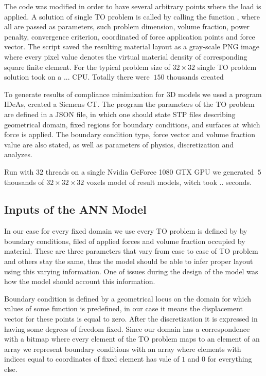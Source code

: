 The code was modified in order to have several arbitrary points where the load is applied.
A solution of single TO problem is called by calling the function  , where all are passed as parameters, such problem dimension, volume fraction, power penalty, convergence criterion, coordinated of force application points and force vector. 
The script saved the resulting material layout as a gray-scale PNG image where every pixel value denotes the virtual material density of corresponding square finite element.
For the typical problem size of $ 32 \times 32 $ single TO problem solution took on a ... CPU.
Totally there were $~150$ thousands  created
\medskip

To generate results of compliance minimization for 3D models we used a program IDeAs\cite{.}, created a Siemens CT.
The program the parameters of the TO problem are defined in a JSON file, in which one should  state STP files describing geometrical domain, fixed regions for boundary conditions, and surfaces at which force is applied.
The boundary condition type, force vector and volume fraction value are also stated, as well as parameters of physics, discretization and analyzes. 

Run with $32$ threads on a single Nvidia GeForce 1080 GTX GPU we generated $~5$ thousands of $32 \times 32 \times 32$ voxels model of result models, witch took .. seconds.
 



\subsection{Inputs of the ANN Model}

In our case for every fixed domain we use every TO problem is defined by by boundary conditions, filed of applied forces and volume fraction occupied by material. 
These are three parameters that vary from case to case of TO problem and others stay the same, thus the model should be able to infer proper layout using this varying information.
One of issues during the design of the model was how the model should account this information.
\medskip

Boundary condition is defined by a geometrical locus on the domain for which values of some function is predefined, in our case it means the displacement vector for these points is equal to zero. 
After the discretization it is expressed in having some degrees of freedom fixed. 
Since our domain has a correspondence with a bitmap where every element of the TO problem maps to an element of an array we represent boundary conditions with an array where elements with indices equal to coordinates of fixed element has vale of $1$ and $0$ for everything else.
\medskip

